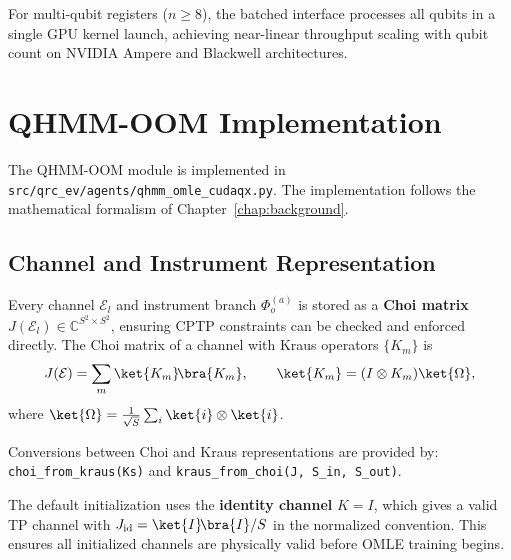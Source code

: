 
For multi-qubit registers ($n \geq 8$), the batched interface processes
all qubits in a single GPU kernel launch, achieving near-linear
throughput scaling with qubit count on NVIDIA Ampere and Blackwell
architectures.



\section{QHMM-OOM Implementation}
\label{sec:qhmm_oom_impl}


The QHMM-OOM module is implemented in
\verb|src/qrc_ev/agents/qhmm_omle_cudaqx.py|. The implementation follows
the mathematical formalism of Chapter~\ref{chap:background}.


\subsection{Channel and Instrument Representation}

Every channel $\mathcal{E}_l$ and instrument branch $\Phi^{(a)}_o$ is
stored as a \textbf{Choi matrix} $J(\mathcal{E}_l) \in \mathbb{C}^{S^2 \times S^2}$,
ensuring CPTP constraints can be checked and enforced directly.
The Choi matrix of a channel with Kraus operators $\{K_m\}$ is
\begin{equation}
J(\mathcal{E}) = \sum_m \ket{K_m}\!\bra{K_m},
\qquad
\ket{K_m} = (I \otimes K_m) \ket{\Omega},
\end{equation}
where $\ket{\Omega} = \frac{1}{\sqrt{S}} \sum_i \ket{i} \otimes \ket{i}$.

Conversions between Choi and Kraus representations are provided by:
\verb|choi_from_kraus(Ks)| and \verb|kraus_from_choi(J, S_in, S_out)|.

The default initialization uses the \textbf{identity channel}
$K = I$, which gives a valid TP channel with $J_{\mathrm{id}} =
\ket{I}\!\bra{I} / S$ in the normalized convention. This ensures all
initialized channels are physically valid before OMLE training begins.

